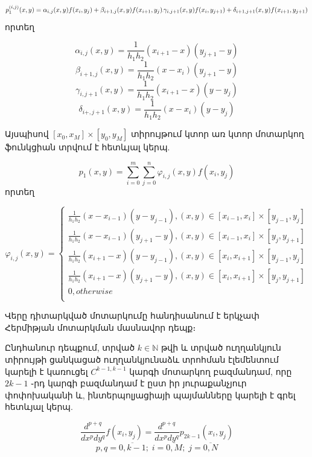 \documentclass[fleqn, bachelor,subf,12pt,notitlepage]{disser}
\newcommand\scalemath[2]{\scalebox{#1}{\mbox{\ensuremath{\displaystyle #2}}}}
\begin{document}
$$\scalemath{0.9}{p_{1}^{(i, j)}(x, y)=\alpha_{i,j}(x,y)f(x_{i},y_{j})+\beta_{i+1,j}(x,y)f(x_{i+1},y_{j})\scalemath{0.2}+\gamma_{i,j+1}(x,y) f(x_{i},y_{j+1})+\delta_{i+1, j+1}(x,y)f(x_{i+1},y_{j+1})}$$
 որտեղ 

$$\alpha_{i,j}(x,y)=\dfrac{1}{h_{1}h_{2}}\left(x_{i+1}-x\right)\left(y_{j+1}-y\right)$$
$$\beta_{i+1,j}(x,y)=\dfrac{1}{h_{1}h_{2}}\left(x-x_{i}\right)\left(y_{j+1}-y\right)$$
$$\gamma_{i,j+1}(x,y)=\dfrac{1}{h_{1}h_{2}}\left(x_{i+1}-x\right)\left(y-y_{j}\right)$$
$$\delta_{i+,j+1}(x,y)=\dfrac{1}{h_{1}h_{2}}\left(x-x_{i}\right)\left(y-y_{j}\right)$$

Այսպիսով $\left[x_{0}, x_{M}\right] \times \left[y_{0}, y_{M}\right]$ տիրույթում կտոր առ կտոր մոտարկող ֆունկցիան տրվում է հետևյալ կերպ.

$$p_{1}(x,y)=\sum_{i=0}^{m}\sum_{j=0}^{n}\varphi_{i,j}(x,y)f(x_{i},y_{j})$$
որտեղ


$$\varphi_{i,j}\left(x, y\right)=\begin{cases}
\frac{1}{h_{1}h_{2}}\left(x-x_{i-1}\right)\left(y-y_{j-1}\right), (x,y)\in \left[x_{i-1}, x_{i}\right]\times\left[y_{j-1}, y_{j}\right]\\
\frac{1}{h_{1}h_{2}}\left(x-x_{i-1}\right)\left(y_{j+1}-y\right), (x,y)\in \left[x_{i-1}, x_{i}\right]\times\left[y_{j}, y_{j+1}\right]\\
\frac{1}{h_{1}h_{2}}\left(x_{i+1}-x\right)\left(y-y_{j-1}\right), (x,y)\in \left[x_{i}, x_{i+1}\right]\times\left[y_{j-1}, y_{j}\right]\\
\frac{1}{h_{1}h_{2}}\left(x_{i+1}-x\right)\left(y_{j+1}-y\right), (x,y)\in \left[x_{i}, x_{i+1}\right]\times\left[y_{j}, y_{j+1}\right]\\
0, otherwise\\
\end{cases}$$

Վերը դիտարկված մոտարկումը հանդիսանում է երկչափ Հերմիթյան մոտարկման մասնավոր դեպք։

Ընդհանուր դեպքում, տրված $k\in \mathbb{N}$ թվի և տրված ուղղանկյուն տիրույթի ցանկացած ուղղանկյունաձև տրոհման էլեմենտում կարելի է կառուցել $C^{k-1, k-1}$ կարգի մոտարկող բազմանդամ, որը $2k-1$ ֊րդ կարգի բազմանդամ է ըստ իր յուրաքանչյուր փոփոխականի և, ինտերպոլյացիայի պայմանները կարելի է գրել հետևյալ կերպ.

$$ \dfrac{d^{p+q}}{dx^p dy^{q}}f(x_{i}, y_{j})=\dfrac{d^{p+q}}{dx^{p}dy^{q}}p_{2k-1}(x_{i}, y_{j})$$
$$p, q = \overline{0, k-1}; \; i=\overline{0, M};  \;  j=\overline{0, N}$$
\end{document}
